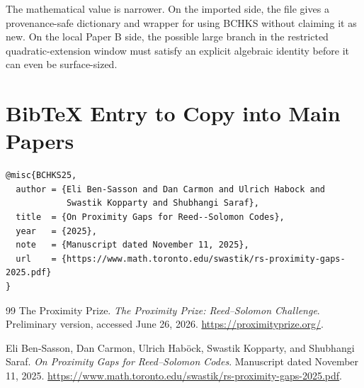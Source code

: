 \documentclass[11pt]{article}
\begin{document}
The mathematical value is narrower.  On the imported side, the file gives a
provenance-safe dictionary and wrapper for using BCHKS without claiming it as
new.  On the local Paper B side, the possible large branch in the restricted
quadratic-extension window must satisfy an explicit algebraic identity before
it can even be surface-sized.

\appendix

\section{BibTeX Entry to Copy into Main Papers}

\begin{verbatim}
@misc{BCHKS25,
  author = {Eli Ben-Sasson and Dan Carmon and Ulrich Habock and
            Swastik Kopparty and Shubhangi Saraf},
  title  = {On Proximity Gaps for Reed--Solomon Codes},
  year   = {2025},
  note   = {Manuscript dated November 11, 2025},
  url    = {https://www.math.toronto.edu/swastik/rs-proximity-gaps-2025.pdf}
}
\end{verbatim}

\begin{thebibliography}{99}
The Proximity Prize.  \emph{The Proximity Prize: Reed--Solomon Challenge}.
Preliminary version, accessed June 26, 2026.
\url{https://proximityprize.org/}.

Eli Ben-Sasson, Dan Carmon, Ulrich Hab\"ock, Swastik Kopparty, and Shubhangi
Saraf.  \emph{On Proximity Gaps for Reed--Solomon Codes}.  Manuscript dated
November 11, 2025.
\url{https://www.math.toronto.edu/swastik/rs-proximity-gaps-2025.pdf}.
\end{thebibliography}
\end{document}
